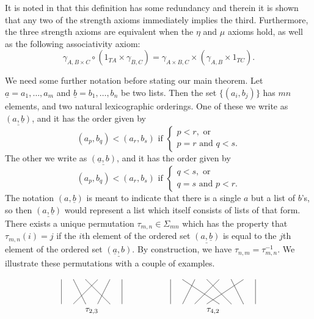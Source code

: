 \begin{rem}
    It is noted in \cite{HP} that this definition has some redundancy and therein it is shown that any two of the strength axioms immediately implies the third. Furthermore, the three strength axioms are equivalent when the $\eta$ and $\mu$ axioms hold, as well as the following associativity axiom:
        \[
            \gamma_{A,B \times C} \circ (1_{TA} \times \gamma_{B,C}) = \gamma_{A \times B,C} \times (\gamma_{A,B} \times 1_{TC}).
        \]
\end{rem}
We need some further notation before stating our main theorem. Let $\underline{a} = a_{1}, \ldots , a_{m}$ and $\underline{b} = b_{1}, \ldots, b_{n}$ be two lists. Then the set $\{ (a_{i}, b_{j})\}$ has $mn$ elements, and two natural lexicographic orderings. One of these we write as $\underline{(a, \underline{b})}$, and it has the order given by
  \[
    (a_{p}, b_{q}) < (a_{r}, b_{s}) \textrm{ if } \left\{ \begin{array}{l} p < r, \textrm{ or } \\ p=r \textrm{ and } q < s. \end{array} \right.
  \]
The other we write as $\underline{(\underline{a}, b)}$, and it has the order given by
\[
    (a_{p}, b_{q}) < (a_{r}, b_{s}) \textrm{ if } \left\{ \begin{array}{l} q < s, \textrm{ or } \\ q=s \textrm{ and } p < r. \end{array} \right.
  \]
The notation $(a, \underline{b})$ is meant to indicate that there is a single $a$ but a list of $b$'s, so then $\underline{(a, \underline{b})}$ would represent a list which itself consists of lists of that form. There exists a unique permutation $\tau_{m,n} \in \Sigma_{mn}$ which has the property that $\tau_{m,n}(i) = j$ if the $i$th element of the ordered set $\underline{(a, \underline{b})}$ is equal to the $j$th element of the ordered set $\underline{(\underline{a}, b)}$. By construction, we have $\tau_{n,m} = \tau_{m,n}^{-1}$. We illustrate these permutations with a couple of examples.
    \[
        \xy
            {\ar@{-} (0,0) ; (0,-10)};
            {\ar@{-} (5,0) ; (10,-10)};
            {\ar@{-} (10,0) ; (20,-10)};
            {\ar@{-} (15,0) ; (5,-10)};
            {\ar@{-} (20,0) ; (15,-10)};
            {\ar@{-} (25,0) ; (25,-10)};
            (12.5,-13)*{\tau_{2,3}};
            {\ar@{-} (45,0) ; (45,-10)};
            {\ar@{-} (50,0) ; (65,-10)};
            {\ar@{-} (55,0) ; (50,-10)};
            {\ar@{-} (60,0) ; (70,-10)};
            {\ar@{-} (65,0) ; (55,-10)};
            {\ar@{-} (70,0) ; (75,-10)};
            {\ar@{-} (75,0) ; (60,-10)};
            {\ar@{-} (80,0) ; (80,-10)};
            (62.5,-13)*{\tau_{4,2}}
        \endxy
    \]

